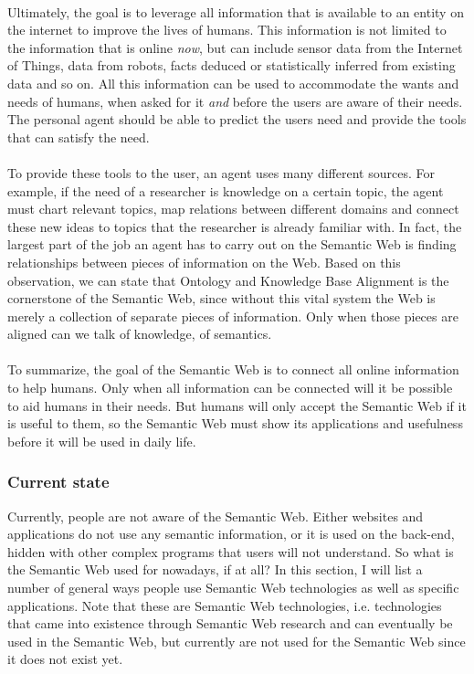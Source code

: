 \documentclass{article}
\begin{document}
 \paragraph{}
 Ultimately, the goal is to leverage all information that is available to an entity on the internet to improve the lives of humans. This information is not limited to the information that is online \emph{now}, but can include sensor data from the Internet of Things, data from robots, facts deduced or statistically inferred from existing data and so on. All this information can be used to accommodate the wants and needs of humans, when asked for it \textit{and} before the users are aware of their needs. The personal agent should be able to predict the users need and provide the tools that can satisfy the need.
 \paragraph{}
 To provide these tools to the user, an agent uses many different sources. For example, if the need of a researcher is knowledge on a certain topic, the agent must chart relevant topics, map relations between different domains and connect these new ideas to topics that the researcher is already familiar with. In fact, the largest part of the job an agent has to carry out on the Semantic Web is finding relationships between pieces of information on the Web. Based on this observation, we can state that Ontology and Knowledge Base Alignment is the cornerstone  of the Semantic Web, since without this vital system the Web is merely a collection of separate pieces of information. Only when those pieces are aligned can we talk of knowledge, of semantics.
 \paragraph{}
 To summarize, the goal of the Semantic Web is to connect all online information to help humans. Only when all information can be connected will it be possible to aid humans in their needs. But humans will only accept the Semantic Web if it is useful to them, so the Semantic Web must show its applications and usefulness before it will be used in daily life.
 \subsubsection{Current state} %
 Currently, people are not aware of the Semantic Web. Either websites and applications do not use any semantic information, or it is used on the back-end, hidden with other complex programs that users will not understand. So what is the Semantic Web used for nowadays, if at all? In this section, I will list a number of general ways people use Semantic Web technologies as well as specific applications. Note that these are Semantic Web technologies, i.e. technologies that came into existence through Semantic Web research and can eventually be used in the Semantic Web, but currently are not used for the Semantic Web since it does not exist yet.
\end{document}
